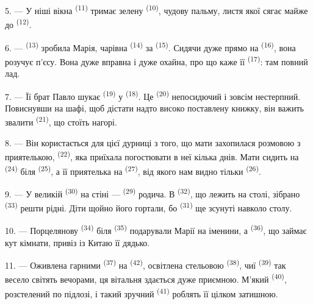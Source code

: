 5. --- У ніші вікна  \textsuperscript{(11)} тримає зелену
 \textsuperscript{(10)}, чудову пальму, листя якої сягає майже до
 \textsuperscript{(12)}.

6. ---  \textsuperscript{(13)} зробила Марія, чарівна
 \textsuperscript{(14)} за 
\textsuperscript{(15)}. Сидячи дуже прямо на 
\textsuperscript{(16)}, вона розучує п'єсу. Вона дуже вправна і дуже охайна, про
що каже її  \textsuperscript{(17)}: там повний лад.

\VUsaut{5.0mm}
\VUsaut{3.0mm}

7. --- Її брат Павло шукає  \textsuperscript{(19)} у
 \textsuperscript{(18)}. Це 
\textsuperscript{(20)} непосидючий і зовсім нестерпний. Повиснувши на шафі, щоб
дістати надто високо поставлену книжку, він важить звалити 
\textsuperscript{(21)}, що стоїть нагорі.

8. --- Він користається для цієї дурниці з того, що мати захопилася розмовою з
приятелькою,  \textsuperscript{(22)}, яка приїхала погостювати в
неї кілька днів. Мати сидить на  \textsuperscript{(24)} біля
 \textsuperscript{(25)}, а її приятелька на 
\textsuperscript{(27)}, від якого нам видно тільки 
\textsuperscript{(26)}.

9. --- У великій  \textsuperscript{(30)} на стіні ---
 \textsuperscript{(29)} родича. В 
\textsuperscript{(32)}, що лежить на столі, зібрано 
\textsuperscript{(33)} решти рідні. Діти щойно його гортали, бо 
\textsuperscript{(31)} ще зсунуті навколо столу.

10. --- Порцелянову  \textsuperscript{(34)} біля
 \textsuperscript{(35)} подарували Марії на іменини, а
 \textsuperscript{(36)}, що займає кут кімнати, привіз із Китаю її
дядько.

11. --- Оживлена гарними  \textsuperscript{(37)} на
 \textsuperscript{(42)}, освітлена стельовою 
\textsuperscript{(38)}, чиї  \textsuperscript{(39)}
так весело світять вечорами, ця вітальня здається дуже приємною. М'який
 \textsuperscript{(40)}, розстелений по підлозі, і такий зручний
 \textsuperscript{(41)} роблять її цілком затишною.

